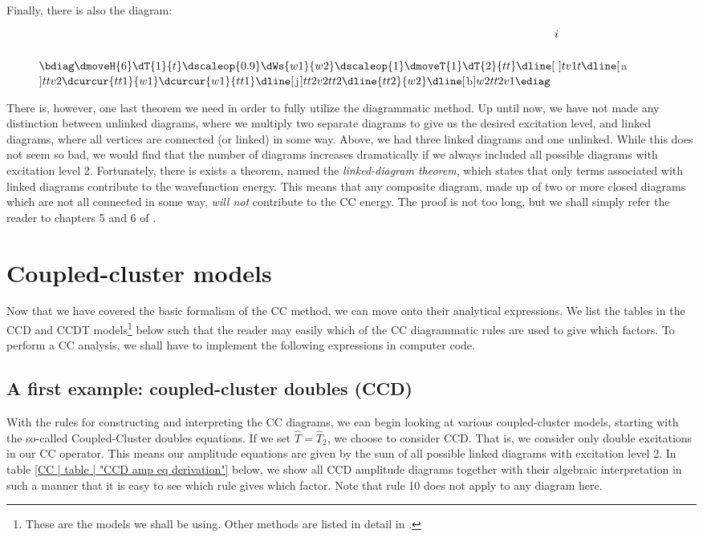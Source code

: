 	Finally, there is also the diagram:
	
	\begin{figure}[h]
		\centering
		$
		\bdiag
		\dmoveH{6}
		\dT{1}{t}
		\dscaleop{0.9}
		\dWs{w1}{w2}
		\dscaleop{1}
		\dmoveT{1}
		\dT{2}{tt}
		\dline[\raisebox{1cm}{$i$}]{tv1}{t}
		\dline[$\:a$]{t}{tv2}
		\dcurcur{tt1}{w1}
		\dcurcur{w1}{tt1}
		\dline[$\:j$]{tt2v2}{tt2}
		\dline{tt2}{w2}
		\dline[$\:b$]{w2}{tt2v1}
		\ediag
		$
	\end{figure}
	
	There is, however, one last theorem we need in order to fully utilize the diagrammatic method. Up until now, we have not made any distinction between unlinked diagrams, where we multiply two separate diagrams to give us the desired excitation level, and linked diagrams, where all vertices are connected (or linked) in some way. Above, we had three linked diagrams and one unlinked. While this does not seem so bad, we would find that the number of diagrams increases dramatically if we always included all possible diagrams with excitation level 2. Fortunately, there is exists a theorem, named the \emph{linked-diagram theorem}, which states that only terms associated with linked diagrams contribute to the wavefunction energy. This means that any composite diagram, made up of two or more closed diagrams which are not all connected in some way, \emph{will not} contribute to the CC energy. The proof is not too long, but we shall simply refer the reader to chapters 5 and 6 of \cite{ShavittBartlett09}.
	
	\section{Coupled-cluster models}
	Now that we have covered the basic formalism of the CC method, we can move onto their analytical expressions. We list the tables in the CCD and CCDT models\footnote{These are the models we shall be using. Other methods are listed in detail in \cite{ShavittBartlett09}.} below such that the reader may easily which of the CC diagrammatic rules are used to give which factors. To perform a CC analysis, we shall have to implement the following expressions in computer code.
	
	\subsection{A first example: coupled-cluster doubles (CCD)}
	With the rules for constructing and interpreting the CC diagrams, we can begin looking at various coupled-cluster models, starting with the so-called Coupled-Cluster doubles equations. If we set $\hat{T} = \hat{T}_2$, we choose to consider CCD. That is, we consider only double excitations in our CC operator. This means our amplitude equations are given by the sum of all possible linked diagrams with excitation level 2. In table \ref{CC | table | "CCD amp eq derivation"} below, we show all CCD amplitude diagrams together with their algebraic interpretation in such a manner that it is easy to see which rule gives which factor. Note that rule 10 does not apply to any diagram here.
	
